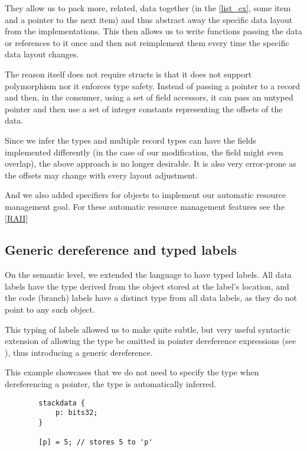 They allow us to pack more, related, data together (in the \cref{list_ex}, some item and a pointer to the next item) and thus abstract away the specific data layout from the implementations. This then allows us to write functions passing the data or references to it once and then not reimplement them every time the specific data layout changes.

The reason \cmm{} itself does not require structs is that it does not support polymorphism nor it enforces type safety. Instead of passing a pointer to a record and then, in the consumer, using a set of field accessors, it can pass an untyped pointer and then use a set of integer constants representing the offsets of the data.

Since we infer the types and multiple record types can have the fields implemented differently (in the case of our modification, the field might even overlap), the above approach is no longer desirable. It is also very error-prone as the offsets may change with every layout adjustment.

And we also added  specifiers for  objects to implement our automatic resource management goal. For these automatic resource management features see the \cref{RAII}

\subsection{Generic dereference and typed labels}

On the semantic level, we extended the language to have typed labels. All data labels have the type derived from the object stored at the label's location, and the code (branch) labels have a distinct type from all data labels, as they do not point to any such object.

This typing of labels allowed us to make quite subtle, but very useful syntactic extension of allowing the type be omitted in pointer dereference expressions (see \cite{ramsey2005c}), thus introducing a generic dereference.

\begin{ex}
    This example showcases that we do not need to specify the type when dereferencing a pointer, the type is automatically inferred.

    \begin{lstlisting}
        stackdata {
            p: bits32;
        }

        [p] = 5; // stores 5 to 'p'
    \end{lstlisting}
\end{ex}

